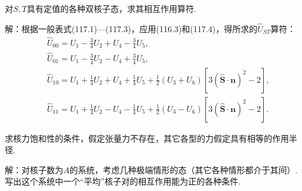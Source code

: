 \begin{xiti}
\setcounter{equation}{0}%

\quad 对$S,T$具有定值的各种双核子态，求其相互作用算符.

解：根据一般表式(117.1)---(117.3)，应用(116.3)和(117.4)，得所求的$\hat{U}_{ST}$算符：
\begin{equation*}
\begin{aligned}
  &\hat{U}_{00}=U_1-\frac{3}{4}U_2+U_4-\frac{3}{4}U_5,\\
  &\hat{U}_{01}=U_1-\frac{3}{4}U_2-U_4+\frac{3}{4}U_5,\\
  &\hat{U}_{10}=U_1+\frac{1}{4}U_2+U_4+\frac{1}{4}U_5
  +\frac{1}{2}\left(U_3+U_6\right)\left[3\left(\hat{\boldsymbol{S}}\cdot\boldsymbol{n}\right)^2-2\right],\\
  &\hat{U}_{11}=U_1+\frac{1}{4}U_2-U_4-\frac{1}{4}U_5
  +\frac{1}{2}\left(U_3-U_6\right)\left[3\left(\hat{\boldsymbol{S}}\cdot\boldsymbol{n}\right)^2-2\right].
\end{aligned}
\end{equation*}

\quad 求核力饱和性的条件，假定张量力不存在，其它各型的力假定具有相等的作用半径.

解：对核子数为$A$的系统，考虑几种极端情形的态（其它各种情形都介于其间）.写出这个系统中一个“平均”核子对的相互作用能为正的各种条件.


\end{xiti}
